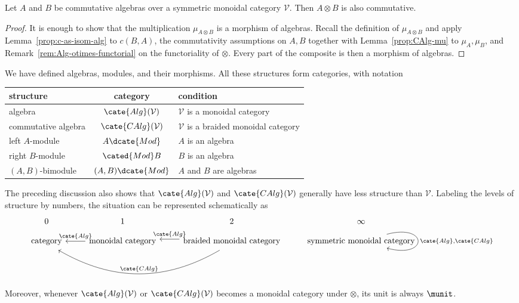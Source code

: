 \begin{proposition}
	Let $A$ and $B$ be commutative algebras over a symmetric monoidal category
	$\mathcal{V}$. Then $A\otimes B$ is also commutative.
\end{proposition}
\begin{proof}
	It is enough to show that the multiplication $\mu_{A\otimes B}$ is a
	morphism of algebras. Recall the definition of $\mu_{A\otimes B}$ and
	apply Lemma~\ref{prop:c-as-isom-alg} to $c(B,A)$, the commutativity
	assumptions on $A,B$ together with Lemma~\ref{prop:CAlg-mu} to
	$\mu_A,\mu_B$, and Remark~\ref{rem:Alg-otimes-functorial} on the
	functoriality of $\otimes$. Every part of the composite is then a
	morphism of algebras.
\end{proof}

We have defined algebras, modules, and their morphisms. All these structures
form categories, with notation
\begin{center}\begin{tabular}{|l|c|p{}|} \hline
	structure & category & condition \\ \hline
	algebra & $\cate{Alg}(\mathcal{V})$ & $\mathcal{V}$ is a monoidal category \\ \hline
	commutative algebra & $\cate{CAlg}(\mathcal{V})$ & $\mathcal{V}$ is a braided monoidal category \\ \hline
	left $A$-module & $A\dcate{Mod}$ & $A$ is an algebra \\ \hline
	right $B$-module & $\cated{Mod}B$ & $B$ is an algebra \\ \hline
	$(A,B)$-bimodule & $(A,B)\dcate{Mod}$ & $A$ and $B$ are algebras \\ \hline
\end{tabular}\end{center}

The preceding discussion also shows that $\cate{Alg}(\mathcal{V})$ and
$\cate{CAlg}(\mathcal{V})$ generally have less structure than
$\mathcal{V}$. Labeling the levels of structure by numbers, the situation can
be represented schematically as
{\scriptsize
\[\begin{tikzcd}[row sep=small]
	0 & 1 & 2 & \infty \\
	\text{category} & \text{monoidal category} \arrow[l, "{\cate{Alg}}"'] & \text{braided monoidal category} \arrow[shift right, l, "{\cate{Alg}}"'] \arrow[shift left, bend left, ll, "{\cate{CAlg}}"'] & \text{symmetric monoidal category} \arrow[loop right, "{\cate{Alg}, \cate{CAlg}}"]
\end{tikzcd}\]
}
Moreover, whenever $\cate{Alg}(\mathcal{V})$ or
$\cate{CAlg}(\mathcal{V})$ becomes a monoidal category under $\otimes$, its
unit is always $\munit$.

